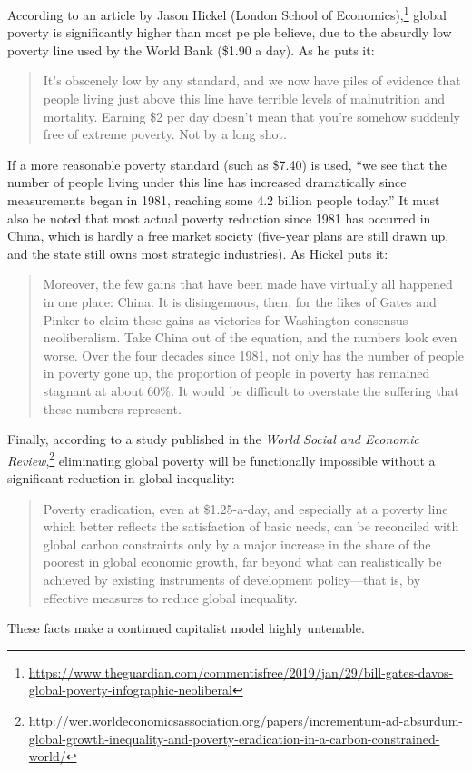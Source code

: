 According to an article by Jason Hickel (London School of Economics),\footnote{\href{https://www.theguardian.com/commentisfree/2019/jan/29/bill-gates-davos-global-poverty-infographic-neoliberal}{https://www.theguardian.com/commentisfree/2019/jan/29/bill-gates-davos-global-poverty-infographic-neoliberal}} global poverty is significantly higher than most pe
ple believe, due to the absurdly low poverty line used by the World Bank (\$1.90 a day). As he puts it:

\begin{quote}
It's obscenely low by any standard, and we now have piles of evidence that people living just above this line have terrible levels of malnutrition and mortality.
Earning \$2 per day doesn't mean that you're somehow suddenly free of extreme poverty.
Not by a long shot.
\end{quote}

If a more reasonable poverty standard (such as \$7.40) is used, ``we see that the number of people living under this line has increased dramatically since measurements began in 1981, reaching some 4.2 billion people today.''
It must also be noted that most actual poverty reduction since 1981 has occurred in China, which is hardly a free market society (five-year plans are still drawn up, and the state still owns most strategic industries).
As Hickel puts it:

\begin{quote}
Moreover, the few gains that have been made have virtually all happened in one place: China.
It is disingenuous, then, for the likes of Gates and Pinker to claim these gains as victories for Washington-consensus neoliberalism.
Take China out of the equation, and the numbers look even worse.
Over the four decades since 1981, not only has the number of people in poverty gone up, the proportion of people in poverty has remained stagnant at about 60\%.
It would be difficult to overstate the suffering that these numbers represent.
\end{quote}

Finally, according to a study published in the \textit{World Social and Economic Review},\footnote{\href{http://wer.worldeconomicsassociation.org/papers/incrementum-ad-absurdum-global-growth-inequality-and-poverty-eradication-in-a-carbon-constrained-world/}{http://wer.worldeconomicsassociation.org/papers/incrementum-ad-absurdum-global-growth-inequality-and-poverty-eradication-in-a-carbon-constrained-world/}} eliminating global poverty will be functionally impossible without a significant reduction in global inequality:

\begin{quote}
Poverty eradication, even at \$1.25-a-day, and especially at a poverty line which better reflects the satisfaction of basic needs, can be reconciled with global carbon constraints only by a major increase in the share of the poorest in global economic growth, far beyond what can realistically be achieved by existing instruments of development policy---that is, by effective measures to reduce global inequality.
\end{quote}

These facts make a continued capitalist model highly untenable.
